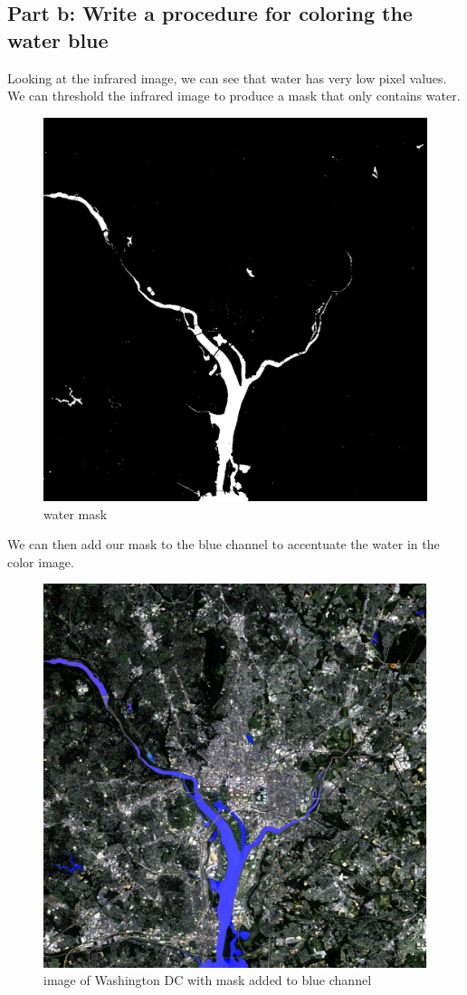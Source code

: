 \documentclass{article}
\begin{document}
	\subsection{Part b: Write a procedure for coloring the water blue}
	Looking at the infrared image, we can see that water has very low pixel values. We can threshold the infrared image to produce a mask that only contains water.
	\begin{figure}[H]
		\includegraphics[width=\linewidth]{6.17/partB/water.png}
		\caption{water mask}
	\end{figure}
	We can then add our mask to the blue channel to accentuate the water in the color image.
	\begin{figure}[H]
		\includegraphics[width=\linewidth]{6.17/partB/washingtonDCwater.png}
		\caption{image of Washington DC with mask added to blue channel}
	\end{figure}
	
\end{document}
